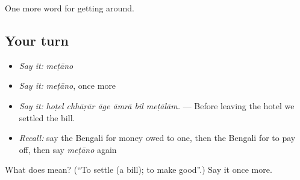 \begin{grammarlens}[title={What you've built}]
One more word for getting around.
\end{grammarlens}

\subsection*{Your turn}
\begin{itemize}
\raggedright
  \item \emph{Say it:} \emph{meṭāno}
  \item \emph{Say it:} \emph{meṭāno}, once more
  \item \emph{Say it:} \emph{hoṭel chhāṛār āge āmrā bil meṭālām.} — Before leaving the hotel we settled the bill.
  \item \emph{Recall:} say the Bengali for money owed to one, then the Bengali for to pay off, then say \emph{meṭāno} again
\end{itemize}

\begin{tcolorbox}[breakable,colback=teal!4,colframe=teal!35!black,title={Before you move on}]
What does  mean? (\textquotedblleft{}To settle (a bill); to make good\textquotedblright{}.) Say it once more.
\end{tcolorbox}
